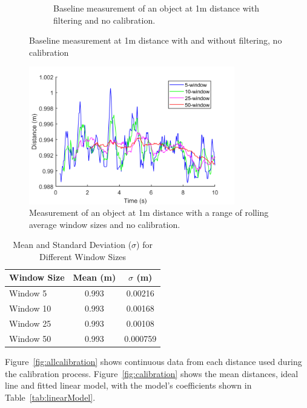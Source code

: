 \documentclass[a4paper,12pt]{article}
\begin{document}
\begin{figure}[htbp]
\begin{subfigure}[b]{0.45\textwidth}
        \caption{Baseline measurement of an object at 1m distance with filtering and no calibration.}
        \label{fig:1mAfter}
    \end{subfigure}
    \caption{Baseline measurement at 1m distance with and without filtering, no calibration}
    \label{fig:1mComparison}
\end{figure}

\begin{figure}[htbp]
    \centering
    \includegraphics[width=0.8\textwidth]{figs/4windowSizes.png}
    \caption{Measurement of an object at 1m distance with a range of rolling average window sizes and no calibration.}
    \label{fig:4windowsize}
\end{figure}

\begin{table}[htbp]
    \centering
    \caption{Mean and Standard Deviation ($\sigma$) for Different Window Sizes}
    \label{tab:4mean_sd}
    \begin{tabular}{lcc}
        \hline
        \textbf{Window Size} & \textbf{Mean (m)} & \textbf{$\sigma$ (m)} \\
        \hline
        Window 5  & 0.993 & 0.00216  \\
        Window 10 & 0.993 & 0.00168  \\
        Window 25 & 0.993 & 0.00108  \\
        Window 50 & 0.993 & 0.000759 \\
        \hline
    \end{tabular}
\end{table}

Figure~\ref{fig:allcalibration} shows continuous data from each distance used during the calibration process. Figure~\ref{fig:calibration} shows the mean distances, ideal line and fitted linear model, with the model's coefficients shown in Table~\ref{tab:linearModel}. 
\end{document}
